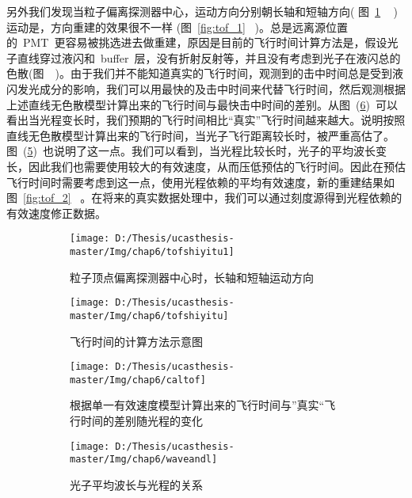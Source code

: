 另外我们发现当粒子偏离探测器中心，运动方向分别朝长轴和短轴方向( 图~\ref{fig:tofshiyitu_1} ~ )运动是，方向重建的效果很不一样 (图~\ref{fig:tof_1}~ )。总是远离源位置的~PMT~更容易被挑选进去做重建，原因是目前的飞行时间计算方法是，假设光子直线穿过液闪和~buffer~层，没有折射反射等，并且没有考虑到光子在液闪总的色散(图~\label{fig:tofshiyitu_1}~)。由于我们并不能知道真实的飞行时间，观测到的击中时间总是受到液闪发光成分的影响，我们可以用最快的及击中时间来代替飞行时间，然后观测根据上述直线无色散模型计算出来的飞行时间与最快击中时间的差别。从图~(\ref{fig:tofcal})~可以看出当光程变长时，我们预期的飞行时间相比“真实”飞行时间越来越大。说明按照直线无色散模型计算出来的飞行时间，当光子飞行距离较长时，被严重高估了。图~(\ref{fig:tofcal_2})~也说明了这一点。我们可以看到，当光程比较长时，光子的平均波长变长，因此我们也需要使用较大的有效速度，从而压低预估的飞行时间。因此在预估飞行时间时需要考虑到这一点，使用光程依赖的平均有效速度，新的重建结果如图~\ref{fig:tof_2}~ 。在将来的真实数据处理中，我们可以通过刻度源得到光程依赖的有效速度修正数据。
\begin{figure}[!htbp]
  \centering
  \begin{subfigure}[b]{\MySubFactor\textwidth}
    \texttt{[image: D:/Thesis/ucasthesis-master/Img/chap6/tofshiyitu1]}
    \caption{粒子顶点偏离探测器中心时，长轴和短轴运动方向}
    \label{fig:tofshiyitu_1}
  \end{subfigure}%
  \quad\quad\quad\quad\quad\quad%
  \begin{subfigure}[b]{\MySubFactor\textwidth}
    \texttt{[image: D:/Thesis/ucasthesis-master/Img/chap6/tofshiyitu]}
    \caption{飞行时间的计算方法示意图}
    \label{fig:tofshiyitu_2}
  \end{subfigure}
   \caption{}
  \label{fig:tofshiyitu}
\end{figure}
\begin{figure}[!htbp]
  \centering
  \begin{subfigure}[b]{\MySubFactor\textwidth}
    \texttt{[image: D:/Thesis/ucasthesis-master/Img/chap6/caltof]}
    \caption{根据单一有效速度模型计算出来的飞行时间与”真实“飞行时间的差别随光程的变化}
    \label{fig:tofcal_1}
  \end{subfigure}%
  \quad\quad\quad\quad\quad\quad%
  \begin{subfigure}[b]{\MySubFactor\textwidth}
    \texttt{[image: D:/Thesis/ucasthesis-master/Img/chap6/waveandl]}
    \caption{光子平均波长与光程的关系}
    \label{fig:tofcal_2}
  \end{subfigure}
   \caption{}
  \label{fig:tofcal}
\end{figure}
